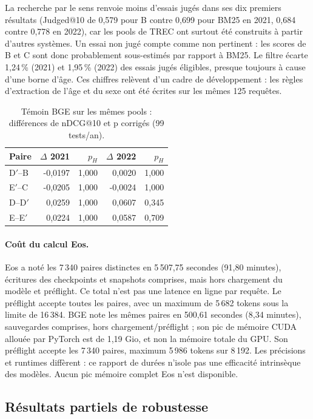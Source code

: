 \documentclass{article}
\begin{document}
La recherche par le sens renvoie moins d'essais jugés dans ses dix premiers résultats (Judged@10 de 0,579 pour B contre 0,699 pour BM25 en 2021, 0,684 contre 0,778 en 2022), car les pools de TREC ont surtout été construits à partir d'autres systèmes. Un essai non jugé compte comme non pertinent : les scores de B et C sont donc probablement sous-estimés par rapport à BM25. Le filtre écarte 1,24\,\% (2021) et 1,95\,\% (2022) des essais jugés éligibles, presque toujours à cause d'une borne d'âge. Ces chiffres relèvent d'un cadre de développement : les règles d'extraction de l'âge et du sexe ont été écrites sur les mêmes 125 requêtes.


\begin{table}[t]
\centering\small
\caption{Témoin BGE sur les mêmes pools : différences de nDCG@10 et p corrigés (99 tests/an).}
\begin{tabular}{lrrrr}
\toprule
Paire & $\Delta$ 2021 & $p_H$ & $\Delta$ 2022 & $p_H$ \\
\midrule
D$'$--B & -0{,}0197 & 1{,}000 & 0{,}0020 & 1{,}000 \\
E$'$--C & -0{,}0205 & 1{,}000 & -0{,}0024 & 1{,}000 \\
D--D$'$ & 0{,}0259 & 1{,}000 & 0{,}0607 & 0{,}345 \\
E--E$'$ & 0{,}0224 & 1{,}000 & 0{,}0587 & 0{,}709 \\
\bottomrule
\end{tabular}
\end{table}
\paragraph{Coût du calcul Eos.} Eos a noté les 7\,340 paires distinctes en 5\,507,75 secondes (91,80 minutes), écritures des checkpoints et snapshots comprises, mais hors chargement du modèle et préflight. Ce total n'est pas une latence en ligne par requête. Le préflight accepte toutes les paires, avec un maximum de 5\,682 tokens sous la limite de 16\,384. BGE note les mêmes paires en 500,61 secondes (8,34 minutes), sauvegardes comprises, hors chargement/préflight ; son pic de mémoire CUDA allouée par PyTorch est de 1,19 Gio, et non la mémoire totale du GPU. Son préflight accepte les 7\,340 paires, maximum 5\,986 tokens sur 8\,192. Les précisions et runtimes diffèrent : ce rapport de durées n'isole pas une efficacité intrinsèque des modèles. Aucun pic mémoire complet Eos n'est disponible.

\subsection{Résultats partiels de robustesse}
\end{document}
